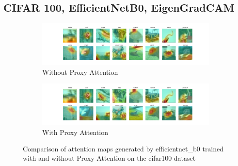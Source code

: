 \subsection{CIFAR 100, EfficientNetB0, EigenGradCAM}

\begin{figure}[!htb]
    \centering
    \begin{subfigure}[b]{1\textwidth}
        \includegraphics[width=\textwidth]{images/cifar100_efficientnet_b0_noproxy_1.pdf}
        \caption{Without Proxy Attention}
    \end{subfigure}
    \hfill
    \begin{subfigure}[b]{1\textwidth}
        \includegraphics[width=\textwidth]{images/cifar100_efficientnet_b0_proxy_1.pdf}
        \caption{With Proxy Attention}
    \end{subfigure}
    \caption{Comparison of attention maps generated by efficientnet\_b0 trained with and without Proxy Attention on the cifar100 dataset}
\end{figure}


